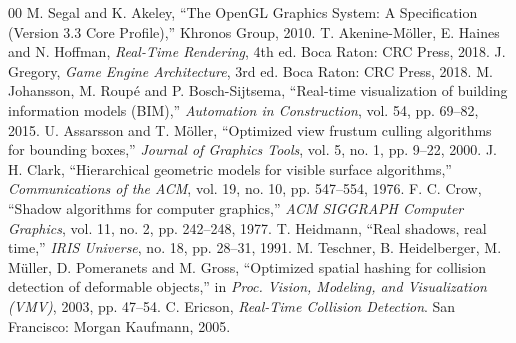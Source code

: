 \documentclass[conference]{IEEEtran}
\begin{document}
\begin{thebibliography}{00}
 M. Segal and K. Akeley, ``The OpenGL Graphics System: A Specification (Version 3.3 Core Profile),'' Khronos Group, 2010.
 T. Akenine-Möller, E. Haines and N. Hoffman, \textit{Real-Time Rendering}, 4th ed. Boca Raton: CRC Press, 2018.
 J. Gregory, \textit{Game Engine Architecture}, 3rd ed. Boca Raton: CRC Press, 2018.
 M. Johansson, M. Roupé and P. Bosch-Sijtsema, ``Real-time visualization of building information models (BIM),'' \textit{Automation in Construction}, vol. 54, pp. 69--82, 2015.
 U. Assarsson and T. Möller, ``Optimized view frustum culling algorithms for bounding boxes,'' \textit{Journal of Graphics Tools}, vol. 5, no. 1, pp. 9--22, 2000.
 J. H. Clark, ``Hierarchical geometric models for visible surface algorithms,'' \textit{Communications of the ACM}, vol. 19, no. 10, pp. 547--554, 1976.
 F. C. Crow, ``Shadow algorithms for computer graphics,'' \textit{ACM SIGGRAPH Computer Graphics}, vol. 11, no. 2, pp. 242--248, 1977.
 T. Heidmann, ``Real shadows, real time,'' \textit{IRIS Universe}, no. 18, pp. 28--31, 1991.
 M. Teschner, B. Heidelberger, M. Müller, D. Pomeranets and M. Gross, ``Optimized spatial hashing for collision detection of deformable objects,'' in \textit{Proc. Vision, Modeling, and Visualization (VMV)}, 2003, pp. 47--54.
 C. Ericson, \textit{Real-Time Collision Detection}. San Francisco: Morgan Kaufmann, 2005.
\end{thebibliography}
\end{document}
